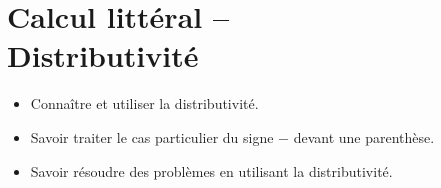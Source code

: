 \chapter{Calcul littéral --\\ Distributivité}\label{ChDistributivite}

\vspace{5cm}
\begin{acquis}
\begin{itemize}
\item Connaître et utiliser la distributivité.
\item Savoir traiter le cas particulier du signe $-$ devant une parenthèse.
\columnbreak
\item Savoir résoudre des problèmes en utilisant la distributivité.
\end{itemize}
\end{acquis}


\activites  


\cours


\exercicesbase
\begin{colonne*exercice}

\end{colonne*exercice}


\exercicesappr
\begin{colonne*exercice}

\end{colonne*exercice}

\connaissances


\TravauxPratiques


\Recreation %



